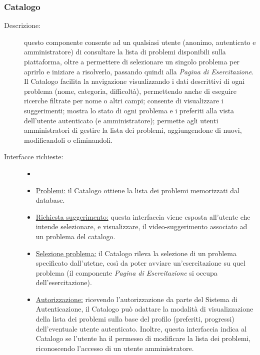 \documentclass[11pt, a4paper]{article}
\theoremstyle{definition} %
\begin{document}
\subsubsection{Catalogo}
\begin{description}
    \item[Descrizione:] questo componente consente ad un qualsiasi utente
    (anonimo, autenticato e amministratore) di consultare la lista di problemi
    disponibili sulla piattaforma, oltre a permettere di selezionare un singolo
    problema per aprirlo e iniziare a risolverlo, passando quindi alla \textit{Pagina di
    Esercitazione}.
    Il Catalogo facilita la navigazione visualizzando i dati descrittivi di ogni
    problema (nome, categoria, difficoltà), permettendo anche di eseguire ricerche
    filtrate per nome o altri campi; consente di visualizzare i suggerimenti;
    mostra lo stato di ogni problema e i
    preferiti alla vista dell'utente autenticato (e amministratore); permette
    agli utenti amministratori di gestire la lista dei problemi, aggiungendone di
    nuovi, modificandoli o eliminandoli.

    \item[Interfacce richieste:]
    \begin{itemize}
        \item[]

        \item \underline{Problemi:} il Catalogo ottiene la lista dei problemi
        memorizzati dal database.

        \item \underline{Richiesta suggerimento:} questa interfaccia
        viene esposta all'utente che intende selezionare, e visualizzare,
        il video-suggerimento associato ad un problema del catalogo.

        \item \underline{Selezione problema:} il Catalogo rileva la
        selezione di un problema specificato dall'utetne, così da
        poter avviare un'esercitazione su quel problema (il componente
        \textit{Pagina di Esercitazione} si occupa dell'esercitazione).

        \item \underline{Autorizzazione:} ricevendo l'autorizzazione
        da parte del Sistema di Autenticazione, il Catalogo può adattare
        la modalità di visualizzazione della lista dei problemi sulla
        base del profilo (preferiti, progressi) dell'eventuale utente
        autenticato. Inoltre, questa interfaccia indica al Catalogo
        se l'utente ha il permesso di modificare la lista dei problemi,
        riconoscendo l'accesso di un utente amministratore.


\end{itemize}
\end{description}
\end{document}
